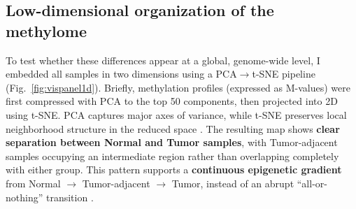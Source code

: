 \documentclass[10pt]{extarticle}
\begin{document}
\subsection{Low-dimensional organization of the methylome}
To test whether these differences appear at a global, genome-wide level, I embedded all samples in two dimensions using a PCA$\rightarrow$t-SNE pipeline (Fig.~\ref{fig:vispanel1d}).  
Briefly, methylation profiles (expressed as M-values) were first compressed with PCA to the top 50 components, then projected into 2D using t-SNE.  
PCA captures major axes of variance, while t-SNE preserves local neighborhood structure in the reduced space \cite{ref15,ref16}.  
The resulting map shows \textbf{clear separation between Normal and Tumor samples}, with Tumor-adjacent samples occupying an intermediate region rather than overlapping completely with either group.  
This pattern supports a \textbf{continuous epigenetic gradient} from Normal $\rightarrow$ Tumor-adjacent $\rightarrow$ Tumor, instead of an abrupt “all-or-nothing” transition \cite{ref12}.

\newlength{\panelheight}
\setlength{\panelheight}{0.24\textheight} 
\end{document}
